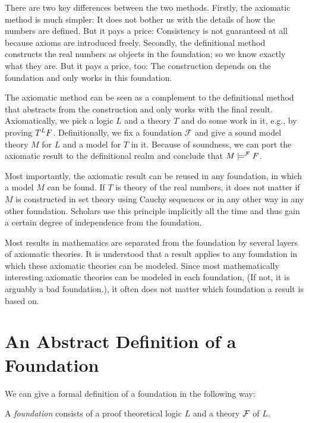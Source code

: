There are two key differences between the two methods. Firstly, the axiomatic method is much simpler: It does not bother us with the details of how the numbers are defined. But it pays a price: Consistency is not guaranteed at all because axioms are introduced freely.
Secondly, the definitional method constructs the real numbers as objects in the foundation; so we know exactly what they are. But it pays a price, too: The construction depends on the foundation and only works in this foundation.

The axiomatic method can be seen as a complement to the definitional method that abstracts from the construction and only works with the final result. Axiomatically, we pick a logic $L$ and a theory $T$ and do some work in it, e.g., by proving $T^L F$. Definitionally, we fix a foundation $\mathcal{F}$ and give a sound model theory $M$ for $L$ and a model for $T$ in it. Because of soundness, we can port the axiomatic result to the definitional realm and conclude that $M\models^{\mathcal{F}} F$.

Most importantly, the axiomatic result can be reused in any foundation, in which a model $M$ can be found. If $T$ is theory of the real numbers, it does not matter if $M$ is constructed in set theory using Cauchy sequences or in any other way in any other foundation. Scholars use this principle implicitly all the time and thus gain a certain degree of independence from the foundation.

Most results in mathematics are separated from the foundation by several layers of axiomatic theories. It is understood that a result applies to any foundation in which these axiomatic theories can be modeled. Since most mathematically interesting axiomatic theories can be modeled in each foundation, (If not, it is arguably a bad foundation.), it often does not matter which foundation a result is based on.

\section{An Abstract Definition of a Foundation}\label{sec:found:abs}

We can give a formal definition of a foundation in the following way:

\begin{definition}[Foundation]
A \emph{foundation} consists of a proof theoretical logic $L$ and a theory $\mathcal{F}$ of $L$.
\end{definition}

